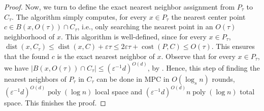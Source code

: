 \documentclass[11pt,letterpaper]{article}
\theoremstyle{plain}
\theoremstyle{definition}
\theoremstyle{remark}
\DeclareMathOperator{\poly}{poly}
\DeclareMathOperator{\cost}{cost}
\DeclareMathOperator{\dist}{dist}
\renewcommand{\epsilon}{\ensuremath{\varepsilon}}
\let\epsilon\varepsilon
\begin{document}
\begin{proof}
    Now, we turn to define the exact nearest neighbor assignment from $P_{\tau}$ to $C_{\tau}$.  
    The algorithm simply computes, for every $x \in P_{\tau}$ the nearest center point $c\in B(x, O(\tau))\cap C_{\tau}$, i.e., only searching the nearest point in an $O(\tau)$ neighborhood of $x$. 
    This algorithm is well-defined,
    since for every $x \in P_\tau$,
    $\dist(x, C_\tau) \leq \dist(x, C) + \epsilon \tau \leq 2\epsilon \tau + \cost(P, C) \leq O(\tau)$. 
    This ensures that the found $c$ is the exact nearest neighbor of $x$.
Observe that for every $x \in P_\tau$, we have $|B(x, O(\tau)) \cap C_\tau| \leq (\epsilon^{-1}d)^{O(d)}$,
    by .
Hence, this step of finding the nearest neighbors of $P_\tau$ in $C_\tau$ 
    can be done in MPC in $O(\log_s n)$ rounds, $(\epsilon^{-1}d)^{O(d)} \poly(\log n)$ local space and $(\epsilon^{-1}d)^{O(d)} n \poly(\log n)$ total space.
    This finishes the proof.
\end{proof}
\end{document}
